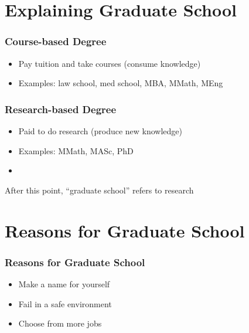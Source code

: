\documentclass{beamer}
\begin{document}
\section{Explaining Graduate School}
\begin{frame}
  \frametitle{Course-based Degree}
  \begin{itemize}
    \item Pay tuition and take courses (consume knowledge)
    \item Examples: law school, med school, MBA, MMath, MEng
  \end{itemize}
\end{frame}

\begin{frame}
  \frametitle{Research-based Degree}
  \begin{itemize}
    \item Paid to do research (produce new knowledge)
    \item Examples: MMath, MASc, PhD
    \item
      \href{http://matt.might.net/articles/phd-school-in-pictures/}{%
        \color{blue}{Matt Might's illustrated guide to a Ph.D.}
      }
  \end{itemize}
  \vspace{2em}
  \pause After this point, ``graduate school'' refers to \alert{research}
\end{frame}

\section{Reasons for Graduate School}
\begin{frame}
  \frametitle{Reasons for Graduate School}
  \href{http://pgbovine.net/why-pursue-PhD.htm}{%
    \color{blue}{From Philip Guo: trade money for freedom}
  }
  \begin{itemize}
    \item Make a name for yourself
    \item Fail in a safe environment
    \item Choose from more jobs
  \end{itemize}
\end{frame}
\end{document}
